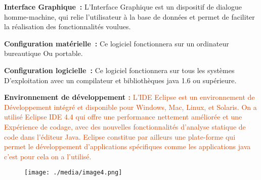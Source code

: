 \documentclass[12pt]{report}
\begin{document}
\vspace{\baselineskip}
\begin{justify}
\textbf{Interface Graphique :}\textit{ }L’Interface Graphique est un dispositif de dialogue homme-machine, qui relie l’utilisateur à la base de données et permet de faciliter la réalisation des fonctionnalités voulues.
\end{justify}\par

\begin{justify}
\textbf{Configuration matérielle :}\textit{ }Ce logiciel fonctionnera sur un ordinateur bureautique Ou portable.
\end{justify}\par

\begin{justify}
\textbf{Configuration logicielle :}\textit{ }Ce logiciel fonctionnera sur tous les systèmes D’exploitation  avec un compilateur et bibliothèques java 1.6 ou supérieure.
\end{justify}\par

\begin{justify}
\textbf{Environnement de développement \textcolor[HTML]{D44501}{:}}\textcolor[HTML]{D44501}{ L'IDE Eclipse est un environnement de Développement intégré et disponible pour Windows, Mac, Linux, et Solaris. On a utilisé Eclipse IDE 4.4 qui offre une performance nettement améliorée et une Expérience de codage, avec des nouvelles fonctionnalités d’analyse statique de code dans l’éditeur Java. Eclipse constitue par ailleurs une plate-forme qui permet le développement d’applications spécifiques comme les applications java c’est pour cela on a l’utilisé.}
\end{justify}\par




\begin{figure}[H]
\advance\leftskip 3.44in		\texttt{[image: ./media/image4.png]}
\end{figure}



\begin{justify}
\textcolor[HTML]{D44501}{\ \ \ \ \ \ \ \ \ \ \ \ \ \ \  }
\end{justify}\par
\end{document}
